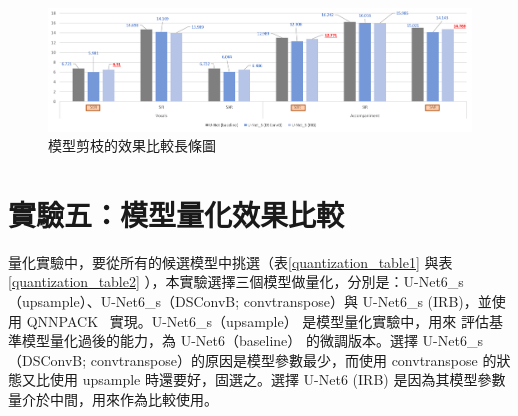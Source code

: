 \begin{table}[htbp]
\centering
{}
\caption{模型剪枝的效果比較表}
\label{pruned_unet_table3}
\end{table}

\begin{figure}[htbp]
    \hfil
    \begin{minipage}[t]{1.0\textwidth}
        \includegraphics[width=\textwidth]{./figures/chapter05_result/pruned_unet_result1.png}
        \caption {模型剪枝的效果比較長條圖}
        \label{pruned_unet_result1}
    \end{minipage}
    \hfil
\end{figure}

\clearpage

\section{實驗五：模型量化效果比較}
量化實驗中，要從所有的候選模型中挑選（表\ref{quantization_table1} 與表 \ref{quantization_table2} ），本實驗選擇三個模型做量化，分別是：U-Net6\_s（upsample）、U-Net6\_s（DSConvB; convtranspose）與 U-Net6\_s (IRB)，並使用 QNNPACK~\cite{dukhan2018qnnpack,wu2019machine} 實現。U-Net6\_s（upsample） 是模型量化實驗中，用來  評估基準模型量化過後的能力，為 U-Net6（baseline） 的微調版本。選擇 U-Net6\_s（DSConvB; convtranspose）的原因是模型參數最少，而使用 convtranspose 的狀態又比使用 upsample 時還要好，固選之。選擇 U-Net6 (IRB) 是因為其模型參數量介於中間，用來作為比較使用。

